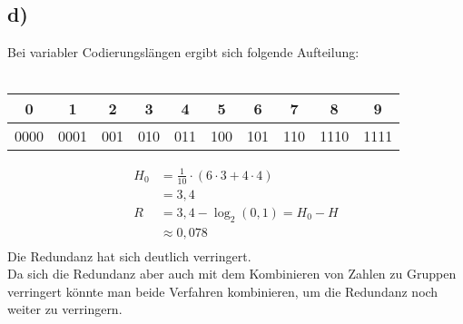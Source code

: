 \documentclass[a4paper]{scrartcl}
\begin{document}
	\subsection{d)}
		Bei variabler Codierungslängen ergibt sich folgende Aufteilung: \\ \\
		\begin{tabular}{c|c|c|c|c|c|c|c|c|c}
			0&1&2&3&4&5&6&7&8&9 \\ \hline
			0000&0001&001&010&011&100&101&110&1110&1111
		\end{tabular}
		\begin{align}
			H_0 &= \frac{1}{10} \cdot (6\cdot 3 + 4\cdot 4) \\
			&= 3,4 \\
			R &= 3,4 -\log_2(0,1) = H_0 - H \\
			&\approx 0,078 \\
		\end{align}
		Die Redundanz hat sich deutlich verringert. \\
		Da sich die Redundanz aber auch mit dem Kombinieren von Zahlen zu Gruppen verringert könnte 
		man beide Verfahren kombinieren, um die Redundanz noch weiter zu verringern.
		
\end{document}
